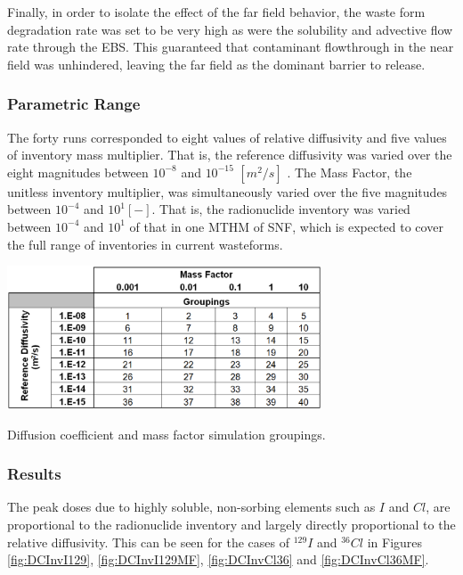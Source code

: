 Finally, in order to isolate the effect of the far field behavior, the waste form 
degradation rate was set to be very high as were the solubility and advective 
flow rate through the  \gls{EBS}. This guaranteed that contaminant flowthrough 
in the near field was unhindered, leaving the far field as the dominant barrier 
to release.


\subsubsection{Parametric Range}
\label{sec:diffCoeffRange}

The forty runs corresponded to eight values of relative diffusivity and five 
values of inventory mass multiplier. That is, the reference diffusivity was varied over the 
eight magnitudes between $ 10^{-8}$ and $10^{-15}$ $[m^2 /s]$ . 
The Mass Factor, the unitless inventory multiplier, was simultaneously varied over 
the five magnitudes between $10^{-4}$ and $10^{1} [-]$. That is, the 
radionuclide inventory was varied between $10^{-4}$ and $10^{1}$ of that in one 
\gls{MTHM} of \gls{SNF}, which is expected to cover the full range of 
inventories in current wasteforms.

\begin{table}[hbp!]
\centering
\includegraphics[width=0.7\textwidth]{./chapters/nuclide_sensitivity/clay/DiffCoeffAndInvEBSFail/DiffCoeffAndInvGroups.eps}
\caption{Diffusion coefficient and mass factor simulation groupings.}
\label{tab:DiffCoeffAndInvGroups}
\end{table}

\subsubsection{Results}


The peak doses due to highly soluble, non-sorbing elements such as $I$ and $Cl$, 
are  proportional to the radionuclide inventory and 
largely directly proportional to the relative diffusivity. This can be seen for 
the cases of $^{129}I$ and $^{36}Cl$ in Figures \ref{fig:DCInvI129}, 
\ref{fig:DCInvI129MF}, \ref{fig:DCInvCl36} and \ref{fig:DCInvCl36MF}.

